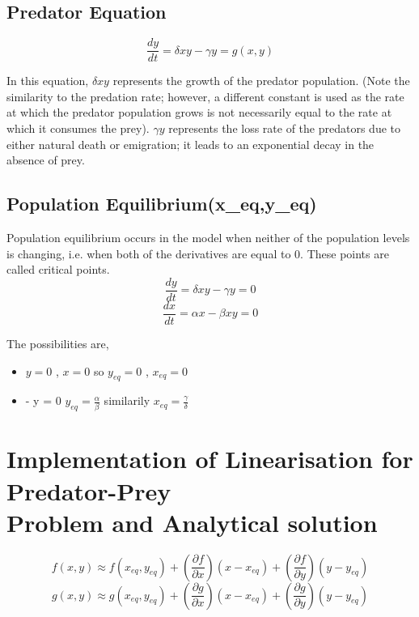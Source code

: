 \documentclass[12pt]{article}
\begin{document}
\subsection*{Predator Equation}
\begin{equation*}
    \frac { d y } { d t } = \delta x y - \gamma y = g(x,y)
\end{equation*}

In this equation, $ \delta x y $ represents the growth of the predator population. (Note the similarity to the predation rate;
however, a different constant is used as the rate at which the predator population grows is not necessarily equal to the
rate at which it consumes the prey). $ \gamma y $ represents the loss rate of the predators due to either natural death or
emigration; it leads to an exponential decay in the absence of prey.

\subsection*{Population Equilibrium(x_{eq},y_{eq})}
Population equilibrium occurs in the model when neither of the population levels is changing, i.e. when both of the
derivatives are equal to $ 0 . $ These points are called critical points.
\begin{equation*}
    \frac { d y } { d t } = \delta x y - \gamma y = 0
\end{equation*}
\begin{equation*}
     \frac { d x } { d t } = \alpha x - \beta x y = 0
\end{equation*}

The possibilities are, 
\begin{itemize}
    \item $ y = 0 $ , $ x = 0 $ so $ y_{eq} = 0 $ , $ x_{eq} = 0 $
    \item \alpha - \beta y = 0 \Longrightarrow $y_{eq} = \frac{\alpha}{\beta}$ similarily $x_{eq} = \frac{\gamma}{\delta}$
\end{itemize}

\section*{Implementation of Linearisation for Predator-Prey \\ Problem and Analytical solution} \cite{noauthor_differential_nodate}

\begin{equation*}
    f ( x , y ) \approx f ( x_{eq} , y_{eq} ) + \left( \frac { \partial f } { \partial x } \right) ( x - x_{eq} ) + \left( \frac { \partial f } { \partial y } \right) ( y - y_{eq} )
\end{equation*}
\begin{equation*}
     g ( x , y ) \approx g ( x_{eq} , y_{eq} ) + \left( \frac { \partial g } { \partial x } \right) ( x - x_{eq} ) + \left( \frac { \partial g } { \partial y } \right) ( y - y_{eq} )
\end{equation*}
\end{document}
